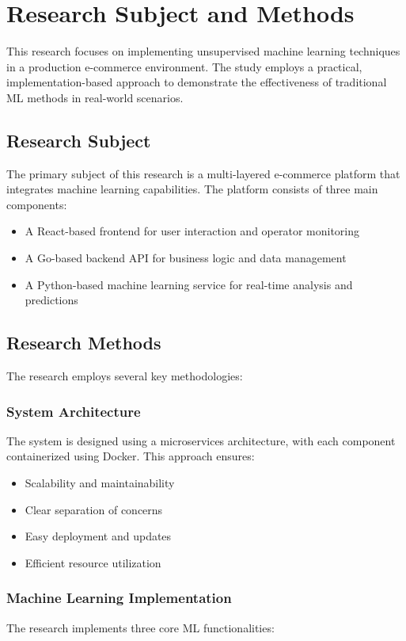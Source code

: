 \documentclass[12pt]{article}
\begin{document}
\section{Research Subject and Methods}
This research focuses on implementing unsupervised machine learning techniques in a production e-commerce environment. The study employs a practical, implementation-based approach to demonstrate the effectiveness of traditional ML methods in real-world scenarios.

\subsection{Research Subject}
The primary subject of this research is a multi-layered e-commerce platform that integrates machine learning capabilities. The platform consists of three main components:
\begin{itemize}
    \item A React-based frontend for user interaction and operator monitoring
    \item A Go-based backend API for business logic and data management
    \item A Python-based machine learning service for real-time analysis and predictions
\end{itemize}

\subsection{Research Methods}
The research employs several key methodologies:

\subsubsection{System Architecture}
The system is designed using a microservices architecture, with each component containerized using Docker. This approach ensures:
\begin{itemize}
    \item Scalability and maintainability
    \item Clear separation of concerns
    \item Easy deployment and updates
    \item Efficient resource utilization
\end{itemize}

\subsubsection{Machine Learning Implementation}
The research implements three core ML functionalities:
\end{document}

